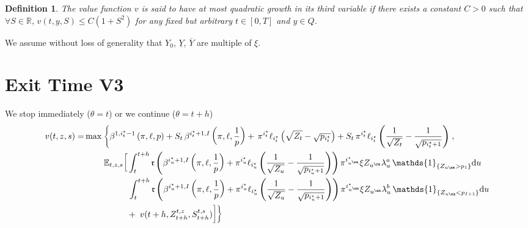 \documentclass[8pt]{article}
\newtheorem{definition}{Definition}
\renewcommand{\d}{\mathrm{d}}
\begin{document}
\begin{definition}
The value function $v$ is said to have at most quadratic growth in its third variable if there exists a constant $C>0$ such that $\forall S \in \mathbb{R}, \, v(t,y,S) \leq C(1+S^2)$ for any fixed but arbitrary $t \in [0,T]$ and $y \in Q$.
\end{definition}

We assume without loss of generality that $Y_0$, $\underline Y$, $\overline{Y}$ are multiple of $\xi$.

\section{Exit Time V3}

We stop immediately ($\theta = t$) or we continue ($\theta = t+h$)
\begin{equation}
\begin{aligned}
    v(t,z,s) = & \max \left\{ \beta^{1,i^\star_{t} -1} \left(\pi, \ell, p\right) + S_{t}\,\beta^{i^\star_{t}+1, I} \left(\pi, \ell, \frac{1}{p} \right) +\, \pi^{i^\star_{t}} \ell_{i^\star_{t}}\left(\sqrt{Z_{t}}-\sqrt{p_{i^\star_{t}}}\right) + S_{t}\,\pi^{i^\star_{t}} \ell_{i^\star_{t}}\left(\frac{1}{\sqrt{Z_{t}}}-\frac{1}{\sqrt{p_{i^\star_{t} +1}}}\right) \right., \\ 
     & \qquad \left. \mathbb{E}_{t,z,s}\bigg[\int_{t}^{t+h}  \mathfrak{r}\left( \beta^{i^\star_u+1,I} \left(\pi, \ell, \frac{1}{p} \right) + \pi^{i^\star_u} \ell_{i^\star_u}\left(\frac{1}{\sqrt{Z_u}}-\frac{1}{\sqrt{p_{i^\star_u +1}}}\right) \right) \pi^{i^\star_{u^\sm}} \xi Z_{u^\sm} \lambda^a_u \, \mathds{1}_{\{Z_{u\sm} > p_1\}} \d u \bigg. \right.\\
    & \qquad \qquad \quad \left. \int_t^{t+h} \mathfrak{r}\left(\beta^{i^\star_u+1,I} \left(\pi, \ell, \frac{1}{p} \right) + \pi^{i^\star_u} \ell_{i^\star_u}\left(\frac{1}{\sqrt{Z_u}}-\frac{1}{\sqrt{p_{i^\star_u +1}}}\right)\right) \pi^{i^\star_{u^\sm}} \xi Z_{u^\sm} \lambda^b_u \, \mathds{1}_{\{Z_{u\sm} < p_{I+1}\}} \d u \bigg. \right. \\
    & \qquad \qquad \quad + \left. \, v(t+h, Z^{t, z}_{t+h}, S^{t, s}_{t+h}) \bigg] \right\} \nonumber
\end{aligned}
\end{equation}
\end{document}
